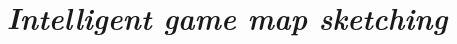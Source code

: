 \documentclass[a4paper,12pt]{report}
\title{
\HRule \\
\textsc{\doctitle} \\
	 \small{\textsl{Intelligent game map sketching}}
\HRule\\
\large{\docplace}
}
\author{\docauthor}
\date{\docdate}
\newcommand{\HRule}{\rule{\linewidth}{0.5mm}}
\begin{document}
\begin{titlepage}
\maketitle
{}
\pagestyle{empty}
\vspace{70 mm}
\end{titlepage}

\tableofcontents
{}
\newpage





\newpage
%
%

\printbibliography
\end{document}
